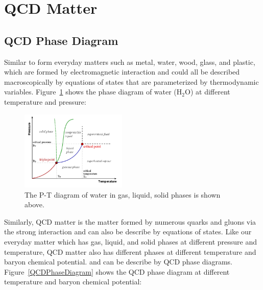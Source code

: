 \section{QCD Matter}

\subsection{QCD Phase Diagram}

Similar to form everyday matters such as metal, water, wood, glass, and plastic, which are formed by electromagnetic interaction and could all be described macroscopically by equations of states that are parameterized by thermodynamic variables. Figure~\ref{QEDPhaseDiagram} shows the phase diagram of water ($\mathrm{H_2O}$) at different temperature and pressure:

\begin{figure}[hbtp]
\begin{center}
\includegraphics[width=0.45\textwidth]{Figures/Chapter1/WaterPhaseDiagram.png}
\caption{The P-T diagram of water in gas, liquid, solid phases is shown above.}
\label{QEDPhaseDiagram}
\end{center}
\end{figure} 


Similarly, QCD matter is the matter formed by numerous quarks and gluons via the strong interaction and can also be describe by equations of states. Like our everyday matter which has gas, liquid, and solid phases at different pressure and temperature, QCD matter also has different phases at different temperature and baryon chemical potential. and can be describe by QCD phase diagrams. Figure~\ref{QCDPhaseDiagram} shows the QCD phase diagram at different temperature and baryon chemical potential:


